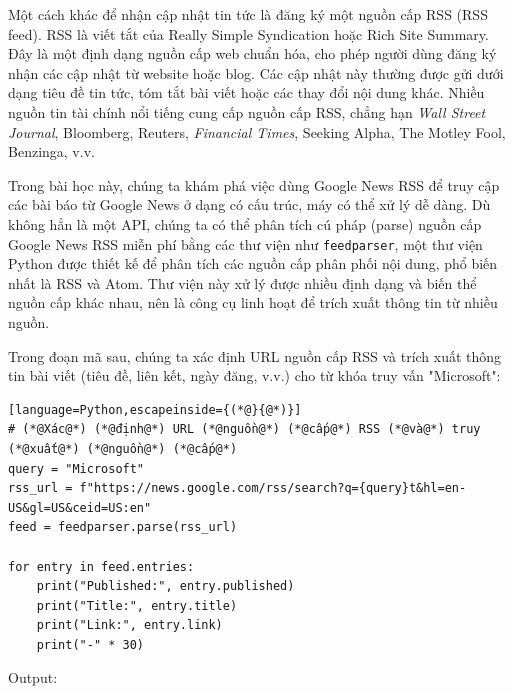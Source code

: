 Một cách khác để nhận cập nhật tin tức là đăng ký một nguồn cấp RSS (RSS feed). RSS là viết tắt của Really Simple Syndication hoặc Rich Site Summary. Đây là một định dạng nguồn cấp web chuẩn hóa, cho phép người dùng đăng ký nhận các cập nhật từ website hoặc blog. Các cập nhật này thường được gửi dưới dạng tiêu đề tin tức, tóm tắt bài viết hoặc các thay đổi nội dung khác. Nhiều nguồn tin tài chính nổi tiếng cung cấp nguồn cấp RSS, chẳng hạn \emph{Wall Street Journal}, Bloomberg, Reuters, \emph{Financial Times}, Seeking Alpha, The Motley Fool, Benzinga, v.v.

Trong bài học này, chúng ta khám phá việc dùng Google News RSS để truy cập các bài báo từ Google News ở dạng có cấu trúc, máy có thể xử lý dễ dàng. Dù không hẳn là một API, chúng ta có thể phân tích cú pháp (parse) nguồn cấp Google News RSS miễn phí bằng các thư viện như \texttt{feedparser}, một thư viện Python được thiết kế để phân tích các nguồn cấp phân phối nội dung, phổ biến nhất là RSS và Atom. Thư viện này xử lý được nhiều định dạng và biến thể nguồn cấp khác nhau, nên là công cụ linh hoạt để trích xuất thông tin từ nhiều nguồn.

Trong đoạn mã sau, chúng ta xác định URL nguồn cấp RSS và trích xuất thông tin bài viết (tiêu đề, liên kết, ngày đăng, v.v.) cho từ khóa truy vấn "Microsoft":

\begin{lstlisting}[language=Python,escapeinside={(*@}{@*)}]
# (*@Xác@*) (*@định@*) URL (*@nguồn@*) (*@cấp@*) RSS (*@và@*) truy (*@xuất@*) (*@nguồn@*) (*@cấp@*)
query = "Microsoft"
rss_url = f"https://news.google.com/rss/search?q={query}t&hl=en-US&gl=US&ceid=US:en"
feed = feedparser.parse(rss_url)

for entry in feed.entries:
    print("Published:", entry.published)
    print("Title:", entry.title)
    print("Link:", entry.link)
    print("-" * 30)
\end{lstlisting}

Output:

